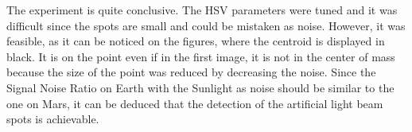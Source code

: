 The experiment is quite conclusive. The HSV parameters were tuned and it was difficult since the spots are small and could be mistaken as noise. However, it was feasible, as it can be noticed on the figures, where the centroid is displayed in black. It is on the point even if in the first image, it is not in the center of mass because the size of the point was reduced by decreasing the noise. Since the Signal Noise Ratio on Earth with the Sunlight as noise should be similar to the one on Mars, it can be deduced that the detection of the artificial light beam spots is achievable.